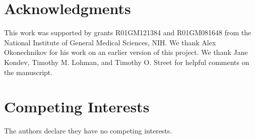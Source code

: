 \section*{Acknowledgments}

This work was supported by grants R01GM121384 and R01GM081648 from the National Institute of General Medical Sciences, NIH. We thank Alex Okonechnikov for his work on an earlier version of this project. We thank Jane Kondev, Timothy M. Lohman, and Timothy O. Street for helpful comments on the manuscript.

\section*{Competing Interests}

The authors declare they have no competing interests.